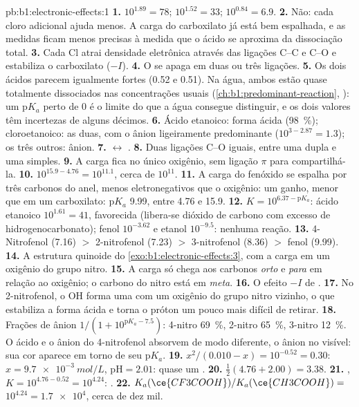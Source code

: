 \begin{solution}{pb:b1:electronic-effects:1}
\textbf{1.} $10^{1.89} = 78$; $10^{1.52} = 33$; $10^{0.84} = 6.9$.
\textbf{2.} Não: cada cloro adicional ajuda menos. A carga do carboxilato
já está bem espalhada, e as medidas ficam menos precisas à medida que o
ácido se aproxima da dissociação total.
\textbf{3.} Cada Cl atrai densidade eletrônica através das ligações C--C
e C--O e estabiliza o carboxilato ($-I$).
\textbf{4.} O  se apaga em duas ou três ligações.
\textbf{5.} Os dois ácidos parecem igualmente fortes (0.52 e 0.51). Na
água, ambos estão quase totalmente dissociados nas concentrações usuais
(\cref{ch:b1:predominant-reaction}, ): um
$\mathrm{p}K_a$ perto de 0 é o limite do que a água consegue distinguir,
e os dois valores têm incertezas de alguns décimos.
\textbf{6.} Ácido etanoico: forma ácida (\qty{98}{\percent});
cloroetanoico: as duas, com o ânion ligeiramente predominante
($10^{3 - 2.87} = 1.3$); os três outros: ânion.
\textbf{7.}  $\leftrightarrow$ .
\textbf{8.} Duas ligações C--O iguais, entre uma dupla e uma simples.
\textbf{9.} A carga fica no único oxigênio, sem ligação $\pi$ para
compartilhá-la.
\textbf{10.} $10^{15.9 - 4.76} = 10^{11.1}$, cerca de $10^{11}$.
\textbf{11.} A carga do fenóxido se espalha por três carbonos do anel,
menos eletronegativos que o oxigênio: um ganho, menor que em um
carboxilato: $\mathrm{p}K_a$ 9.99, entre 4.76 e 15.9.
\textbf{12.} $K = 10^{6.37 - \mathrm{p}K_a}$: ácido etanoico $10^{1.61} = 41$,
favorecida (libera-se dióxido de carbono com excesso de
hidrogenocarbonato); fenol $10^{-3.62}$ e etanol $10^{-9.5}$: nenhuma
reação.
\textbf{13.} 4-Nitrofenol (7.16) $>$ 2-nitrofenol (7.23) $>$ 3-nitrofenol
(8.36) $>$ fenol (9.99).
\textbf{14.} A estrutura quinoide do \cref{exo:b1:electronic-effects:3},
com a carga em um oxigênio do grupo nitro.
\textbf{15.} A carga só chega aos carbonos \textit{orto} e \textit{para}
em relação ao oxigênio; o carbono do nitro está em \textit{meta}.
\textbf{16.} O efeito $-I$ de .
\textbf{17.} No 2-nitrofenol, o OH forma uma  com um
oxigênio do grupo nitro vizinho, o que estabiliza a forma ácida e torna
o próton um pouco mais difícil de retirar.
\textbf{18.} Frações de ânion $1/(1 + 10^{\mathrm{p}K_a - 7.5})$: 4-nitro
\qty{69}{\percent}, 2-nitro \qty{65}{\percent}, 3-nitro
\qty{12}{\percent}. O ácido e o ânion do 4-nitrofenol absorvem de modo
diferente, o ânion no visível: sua cor aparece em torno de seu
$\mathrm{p}K_a$.
\textbf{19.} $x^2/(0.010 - x) = 10^{-0.52} = 0.30$: $x = \qty{9.7e-3}{mol/L}$,
$\mathrm{pH} = 2.01$: quase um .
\textbf{20.} $\frac12(4.76 + 2.00) = 3.38$.
\textbf{21.} , $K = 10^{4.76 -
0.52} = 10^{4.24}$: .
\textbf{22.} $K_a(\ce{CF3COOH})/K_a(\ce{CH3COOH}) =$ \textbf{$10^{4.24} =
\num{1.7e4}$}, cerca de dez mil.
\end{solution}
